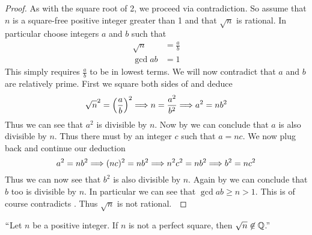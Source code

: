         \begin{proof}
            As with the square root of 2, we proceed via contradiction. So assume that $n$
            is a square-free positive integer greater than 1 and that $\sqrt{n}$ is rational.
            In particular choose integers $a$ and $b$ such that
            \begin{align}
                \label{Square-root irrational proof eq 1}
                \sqrt{n} &= \frac{a}{b} \\
                \gcd{a}{b} &= 1
                \label{Square-root irrational proof eq 2}
            \end{align}
            This simply requires $\frac{a}{b}$ to be in lowest terms. We will now contradict
            that $a$ and $b$ are relatively prime. First we square both sides of
             and deduce
            \[
                \sqrt{n}^2 = \left( \frac{a}{b}\right)^2 \Longrightarrow
                n = \frac{a^2}{b^2} \Longrightarrow
                a^2 = nb^2
            \]
            Thus we can see that $a^2$ is divisible by $n$. Now by
             we can conclude that $a$ is
            also divisible by $n$. Thus there must by an integer $c$ such that
            $a = nc$. We now plug back and continue our deduction
            \[
                a^2 = nb^2 \Longrightarrow
                (nc)^2 = nb^2 \Longrightarrow
                n^2c^2 = nb^2 \Longrightarrow
                b^2 = nc^2
            \]
            Thus we can now see that $b^2$ is also divisible by $n$. Again by
             we can conclude that $b$ too
            is divisible by $n$. In particular we can see that $\gcd{a}{b} \ge n > 1$.
            This is of course contradicts
            .
            Thus $\sqrt{n}$ is not rational.~\QED
        \end{proof}
        \begin{corollary}
            $``$Let $n$ be a positive integer. If $n$ is not a perfect square, then
            $\sqrt{n} \not\in \mathbb{Q}$.''
        \end{corollary}

